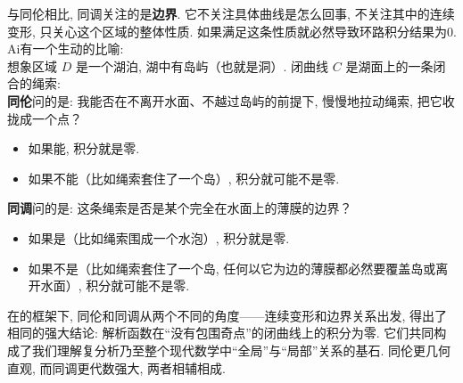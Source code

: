 \documentclass[UTF8]{ctexart}
\begin{document}
        与同伦相比, 同调关注的是\textbf{边界}. 它不关注具体曲线是怎么回事, 不关注其中的连续变形, 只关心这个区域的整体性质. 如果满足这条性质就必然导致环路积分结果为0.\\
        Ai有一个生动的比喻:\\
        想象区域  \(D\)  是一个湖泊, 湖中有岛屿（也就是洞）. 闭曲线  \(C\)  是湖面上的一条闭合的绳索:\\
        \textbf{同伦}问的是: 我能否在不离开水面、不越过岛屿的前提下, 慢慢地拉动绳索, 把它收拢成一个点？

        \begin{itemize}
            \item 如果能, 积分就是零. 
            \item 如果不能（比如绳索套住了一个岛）, 积分就可能不是零. 
        \end{itemize}

        \textbf{同调}问的是: 这条绳索是否是某个完全在水面上的薄膜的边界？

        \begin{itemize}
            \item 如果是（比如绳索围成一个水泡）, 积分就是零. 
            \item 如果不是（比如绳索套住了一个岛, 任何以它为边的薄膜都必然要覆盖岛或离开水面）, 积分就可能不是零. 
        \end{itemize}

        在\CauchyThm 的框架下, 同伦和同调从两个不同的角度——连续变形和边界关系出发, 得出了相同的强大结论: 解析函数在“没有包围奇点”的闭曲线上的积分为零. 它们共同构成了我们理解复分析乃至整个现代数学中“全局”与“局部”关系的基石. 同伦更几何直观, 而同调更代数强大, 两者相辅相成. 
\end{document}
